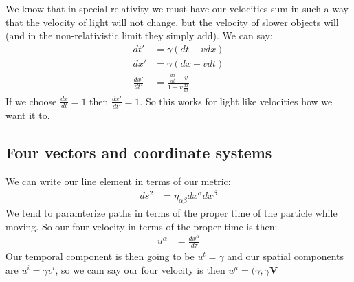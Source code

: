 We know that in special relativity we must have our velocities sum in such a way that the velocity of light will not change, but the velocity of slower objects will (and in the non-relativistic limit they simply add).
We can say:
\begin{align*}
	dt' &= \gamma(dt - vdx) \\
	dx' &= \gamma(dx -v dt) \\
	\frac{dx'}{dt'} &= \frac{\frac{dx}{dt} - v}{1 -v \frac{dx}{dt}}
\end{align*}
If we choose $\frac{dx}{dt} = 1$ then $\frac{dx'}{dt'} = 1$. So this works for light like velocities how we want it to.

\subsection{Four vectors and coordinate systems}
We can write our line element in terms of our metric:
\begin{align*}
	ds^2 &= \eta_{\alpha\beta} dx^\alpha dx^\beta
\end{align*}
We tend to paramterize paths in terms of the proper time of the particle while moving. So our four velocity in terms of the proper time is then:
\begin{align*}
	u^\alpha &= \frac{dx^\alpha}{d\tau}
\end{align*}
Our temporal component is then going to be $u^t = \gamma$ and our spatial components are $u^i = \gamma v^i$, so we cam say our four velocity is then $u^\mu = (\gamma,\gamma \bm{V}$
